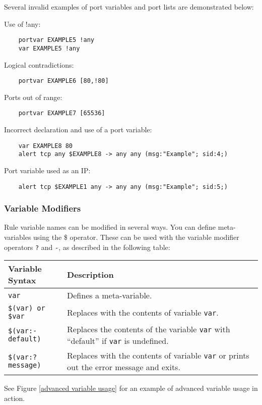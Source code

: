 \documentclass[english]{report}
\begin{document}
Several invalid examples of port variables and port lists are demonstrated below:

Use of !any:
\begin{verbatim}     
    portvar EXAMPLE5 !any
    var EXAMPLE5 !any
\end{verbatim}
Logical contradictions:
\begin{verbatim}     
    portvar EXAMPLE6 [80,!80]
\end{verbatim}
Ports out of range:
\begin{verbatim}     
    portvar EXAMPLE7 [65536]
\end{verbatim}
Incorrect declaration and use of a port variable:
\begin{verbatim}     
    var EXAMPLE8 80 
    alert tcp any $EXAMPLE8 -> any any (msg:"Example"; sid:4;)
\end{verbatim}
Port variable used as an IP:
\begin{verbatim}     
    alert tcp $EXAMPLE1 any -> any any (msg:"Example"; sid:5;)
\end{verbatim}


\subsubsection{Variable Modifiers}

Rule variable names can be modified in several ways. You can define
meta-variables using the \$ operator. These can be used with the variable
modifier operators {\tt ?}  and {\tt -}, as described in the following table: 

\begin{tabular}{| l | p{5in} |}
\hline
\textbf{Variable Syntax} & \textbf{Description}\\
\hline
\hline
\texttt{var} & Defines a meta-variable.\\
\hline
\texttt{\$(var) or \$var} & Replaces with the contents of variable \texttt{var}.\\
\hline
\texttt{\$(var:-default)} & Replaces the contents of the variable \texttt{var} with ``default'' if 
   \texttt{var} is undefined.\\
\hline
\texttt{\$(var:?message)} & Replaces with the contents of variable \texttt{var} or prints out the
error message and exits.\\
\hline
\end{tabular}


See Figure \ref{advanced variable usage} for an example of advanced variable usage in action.
\end{document}
